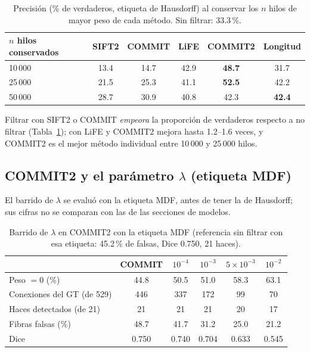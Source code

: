 \documentclass[11pt,a4paper]{article}
\begin{document}
\begin{table}[H]
\centering
\small
\begin{tabular}{@{}lccccc@{}}
\toprule
$n$ hilos conservados & \textbf{SIFT2} & \textbf{COMMIT} & \textbf{LiFE} & \textbf{COMMIT2} & \textbf{Longitud}\\
\midrule
10\,000 & 13.4 & 14.7 & 42.9 & \textbf{48.7} & 31.7\\
25\,000 & 21.5 & 25.3 & 41.1 & \textbf{52.5} & 42.2\\
50\,000 & 28.7 & 30.9 & 40.8 & 42.3 & \textbf{42.4}\\
\bottomrule
\end{tabular}
\caption{Precisi\'on (\% de verdaderos, etiqueta de Hausdorff) al conservar los $n$ hilos de
mayor peso de cada m\'etodo. Sin filtrar: 33.3\,\%.}
\label{tab:mismon-haus}
\end{table}

Filtrar con SIFT2 o COMMIT \emph{empeora} la proporci\'on de verdaderos respecto a no filtrar
(Tabla~\ref{tab:mismon-haus}); con LiFE y COMMIT2 mejora hasta 1.2--1.6 veces, y COMMIT2 es el
mejor m\'etodo individual entre 10\,000 y 25\,000 hilos.

\subsection{COMMIT2 y el par\'ametro $\lambda$ (etiqueta MDF)}
\label{sec:res-mdf-ini}

El barrido de $\lambda$ se evalu\'o con la etiqueta MDF, antes de tener la de Hausdorff; sus
cifras no se comparan con las de las secciones de modelos.

\begin{table}[H]
\centering
\small
\begin{tabular}{@{}lccccc@{}}
\toprule
 & COMMIT & $10^{-4}$ & $10^{-3}$ & $5\times10^{-3}$ & $10^{-2}$\\
\midrule
Peso $=0$ (\%)              & 44.8 & 50.5 & 51.0 & 58.3 & 63.1\\
Conexiones del GT (de 529)  & 446  & 337  & 172  & 99   & 70\\
Haces detectados (de 21)    & 21   & 21   & 21   & 20   & 17\\
Fibras falsas (\%)          & 48.7 & 41.7 & 31.2 & 25.0 & 21.2\\
Dice                        & 0.750& 0.740& 0.704& 0.633& 0.545\\
\bottomrule
\end{tabular}
\caption{Barrido de $\lambda$ en COMMIT2 con la etiqueta MDF (referencia sin filtrar con esa
etiqueta: 45.2\,\% de falsas, Dice 0.750, 21 haces).}
\label{tab:lambda}
\end{table}
\end{document}
